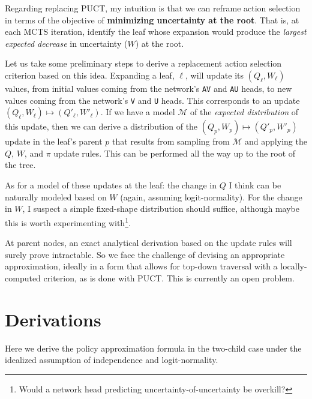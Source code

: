 \documentclass[tikz]{article}
\begin{document}
Regarding replacing PUCT, my intuition is that we can reframe action selection in terms of the objective of \textbf{minimizing uncertainty at the root}.
That is, at each MCTS iteration, identify the leaf whose expansion would produce the \textit{largest expected decrease} in uncertainty ($W$) at the root. \newline

Let us take some preliminary steps to derive a replacement action selection criterion based on this idea. Expanding a leaf, $\ell$, will update its $(Q_\ell, W_\ell)$ values, 
from initial values coming from the network's \texttt{AV} and \texttt{AU} heads, to new values coming from the network's \texttt{V} and \texttt{U}
heads. This corresponds to an update $(Q_\ell, W_\ell) \mapsto (Q'_\ell, W'_\ell)$. If we have a model $\mathcal{M}$ of the \textit{expected distribution} of this update,
then we can derive a distribution of the $(Q_p, W_p)\mapsto (Q'_p, W'_p)$ update in the leaf's parent $p$ 
that results from sampling from $\mathcal{M}$ and applying the $Q$, $W$, and $\pi$ update rules.
This can be performed all the way up to the root of the tree. \newline

As for a model of these updates at the leaf: the change in $Q$ I think can be naturally modeled based on $W$ (again, assuming logit-normality).
For the change in $W$, I suspect a simple fixed-shape distribution should suffice, although maybe this is worth experimenting with\footnote{Would a
network head predicting uncertainty-of-uncertainty be overkill?}. \newline

At parent nodes, an exact analytical derivation based on the update rules will surely prove intractable. So we face the challenge of devising an appropriate
approximation, ideally in a form that allows for top-down traversal with a locally-computed criterion, as is done with PUCT. This is currently
an open problem.

\newpage
\appendix
\renewcommand{\thesection}{Appendix \Alph{section}} %

\section{Derivations}
\label{appendix-derivations}

Here we derive the policy approximation formula in the two-child case under the idealized assumption of independence and logit-normality. \newline
\end{document}
